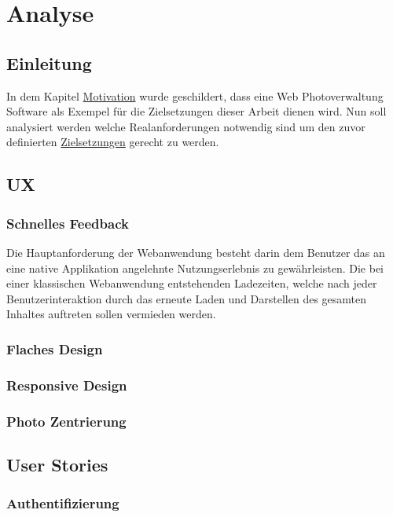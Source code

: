 \chapter{Analyse}

\section{Einleitung}

In dem Kapitel \hyperref[sec:motivation]{Motivation} wurde geschildert, dass eine Web Photoverwaltung Software als Exempel für die Zielsetzungen dieser Arbeit dienen wird. Nun soll analysiert werden welche Realanforderungen notwendig sind um den zuvor definierten \hyperref[sec:zielsetzung]{Zielsetzungen} gerecht zu werden.

\section{UX}

\subsection{Schnelles Feedback}

Die Hauptanforderung der Webanwendung besteht darin dem Benutzer das an eine
native Applikation angelehnte Nutzungserlebnis zu gewährleisten. Die bei einer
klassischen Webanwendung entstehenden Ladezeiten, welche nach jeder
Benutzerinteraktion durch das erneute Laden und Darstellen des gesamten Inhaltes
auftreten sollen vermieden werden.

\subsection{Flaches Design}

\subsection{Responsive Design}

\subsection{Photo Zentrierung}

\section{User Stories}

\subsection{Authentifizierung}

